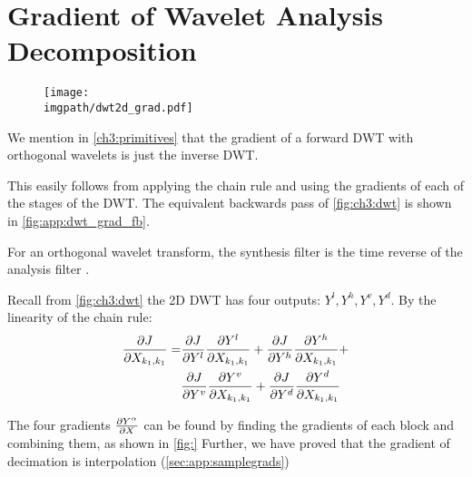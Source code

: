 \section{Gradient of Wavelet Analysis Decomposition}\label{sec:app:analysis_gradient}
\begin{figure}
  \centering
  \texttt{[image: \\imgpath/dwt2d\_grad.pdf]}
  \label{fig:app:dwt_grad_fb}
\end{figure}
We mention in \autoref{ch3:primitives} that the gradient of a forward DWT with
orthogonal wavelets is just the inverse DWT. 

This easily follows from applying the chain rule and using the gradients of each of the
stages of the DWT. The equivalent backwards pass of \autoref{fig:ch3:dwt} is
shown in \autoref{fig:app:dwt_grad_fb}.

For an orthogonal wavelet transform, the synthesis filter is the time reverse of
the analysis filter \cite[Chapter 3]{vetterli_wavelets_2007}.



Recall from \autoref{fig:ch3:dwt} the 2D DWT has four outputs: $Y^l, Y^h, Y^v,
Y^d$. By the linearity of the chain rule:
\begin{align}
  \frac{\partial J}{\partial X_{k_1, k_1}} =& \frac{\partial J}{\partial Y^l}\frac{\partial Y^l}{\partial X_{k_1, k_1}} +
  \frac{\partial J}{\partial Y^h}\frac{\partial Y^h}{\partial X_{k_1, k_1}} + \\
  &\frac{\partial J}{\partial Y^v}\frac{\partial Y^v}{\partial X_{k_1, k_1}} + \frac{\partial J}{\partial Y^d}\frac{\partial Y^d}{\partial X_{k_1, k_1}} 
\end{align}

The four gradients $\frac{\partial Y^\alpha}{\partial X}$ can be found by finding the gradients of
each block and combining them, as shown in \autoref{fig:}
Further, we have proved that the gradient of decimation is interpolation
(\autoref{sec:app:samplegrads})

